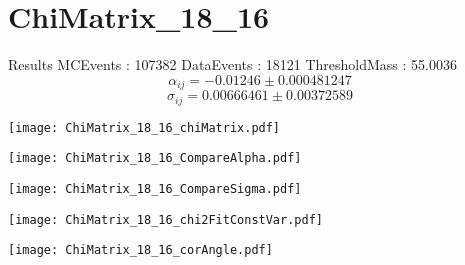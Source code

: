 \documentclass[a4paper,12pt]{article}
\begin{document}
\section{ChiMatrix\_18\_16}
\begin{minipage}{0.49\linewidth} Results \newline
MCEvents : 107382\newline
DataEvents : 18121 \newline
ThresholdMass : 55.0036\\
$$\alpha_{ij} = -0.01246\pm 0.000481247$$
$$\sigma_{ij} = 0.00666461\pm 0.00372589$$
\end{minipage}\hfill
\begin{minipage}{0.49\linewidth} 
\texttt{[image: ChiMatrix\_18\_16\_chiMatrix.pdf]}\\
\end{minipage}
\hfill
\begin{minipage}{0.49\linewidth} 
\texttt{[image: ChiMatrix\_18\_16\_CompareAlpha.pdf]}\\
\end{minipage}
\hfill
\begin{minipage}{0.49\linewidth} 
\texttt{[image: ChiMatrix\_18\_16\_CompareSigma.pdf]}\\
\end{minipage}
\begin{minipage}{0.49\linewidth} 
\texttt{[image: ChiMatrix\_18\_16\_chi2FitConstVar.pdf]}\\
\end{minipage}
\hfill
\begin{minipage}{0.49\linewidth} 
\texttt{[image: ChiMatrix\_18\_16\_corAngle.pdf]}\\
\end{minipage}
\end{document}

